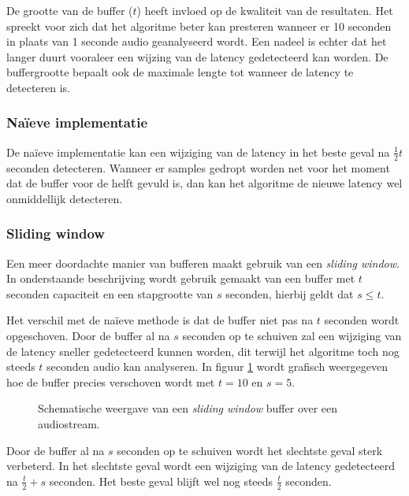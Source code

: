 De grootte van de buffer ($ t $) heeft invloed op de kwaliteit van de resultaten. Het spreekt voor zich dat het algoritme beter kan presteren wanneer er 10 seconden in plaats van 1 seconde audio geanalyseerd wordt. Een nadeel is echter dat het langer duurt vooraleer een wijzing van de latency gedetecteerd kan worden. De buffergrootte bepaalt ook de maximale lengte tot wanneer de latency te detecteren is. 

\subsubsection{Naïeve implementatie}

De naïeve implementatie kan een wijziging van de latency in het beste geval na $ \frac{1}{2} t $ seconden detecteren. Wanneer er samples gedropt worden net voor het moment dat de buffer voor de helft gevuld is, dan kan het algoritme de nieuwe latency wel onmiddellijk detecteren.

\subsubsection{Sliding window}

Een meer doordachte manier van bufferen maakt gebruik van een \textit{sliding window}. In onderstaande beschrijving wordt gebruik gemaakt van een buffer met $ t $ seconden capaciteit en een stapgrootte van $ s $ seconden, hierbij geldt dat $ s \leq t $. 

Het verschil met de naïeve methode is dat de buffer niet pas na $ t $ seconden wordt opgeschoven. Door de buffer al na $ s $ seconden op te schuiven zal een wijziging van de latency sneller gedetecteerd kunnen worden, dit terwijl het algoritme toch nog steeds $ t $ seconden audio kan analyseren. In figuur \ref{slidingwindow} wordt grafisch weergegeven hoe de buffer precies verschoven wordt met $ t = 10 $ en $ s = 5 $.

\begin{figure}[h!]
	\captionsetup{width=0.7\textwidth}
	\caption[Schematische weergave van de buffer]{Schematische weergave van een \textit{sliding window} buffer over een audiostream.}
	\begin{center}
		\advance\parskip0.3cm
		
	\end{center}
	\label{slidingwindow}
\end{figure}

Door de buffer al na $ s $ seconden op te schuiven wordt het slechtste geval sterk verbeterd. In het slechtste geval wordt een wijziging van de latency gedetecteerd na $ \frac{t}{2} + s $ seconden. Het beste geval blijft wel nog steeds $ \frac{t}{2} $ seconden.

